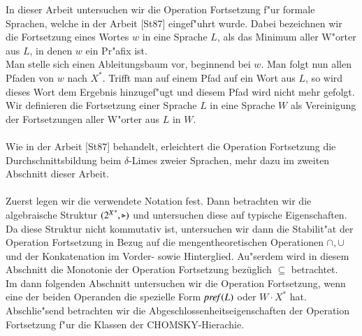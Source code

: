 In dieser Arbeit untersuchen wir die Operation Fortsetzung f"ur formale Sprachen, welche in der Arbeit [St87] eingef"uhrt wurde. Dabei bezeichnen wir die Fortsetzung eines Wortes $w$ in eine Sprache $L$, als das Minimum aller W"orter aus $L$, in denen $w$ ein Pr"afix ist. 
\\Man stelle sich einen Ableitungsbaum vor, beginnend bei $w$.
Man folgt nun allen Pfaden von $w$ nach $X^*$. Trifft man auf einem Pfad auf ein Wort aus $L$, so wird dieses Wort dem Ergebnis hinzugef"ugt und diesem Pfad wird nicht mehr gefolgt.\\
Wir definieren die Fortsetzung einer Sprache $L$ in eine Sprache $W$ als Vereinigung der Fortsetzungen aller W"orter aus $L$ in $W$.\\\\
Wie in der Arbeit [St87] behandelt, erleichtert die Operation Fortsetzung die Durchschnittsbildung beim $\delta$-Limes zweier Sprachen, mehr dazu im zweiten Abschnitt dieser Arbeit.\\\\
Zuerst legen wir die verwendete Notation fest. Dann betrachten wir die algebraische Struktur $({2^X}^*,\triangleright)$ und untersuchen diese auf typische Eigenschaften.
Da diese Struktur nicht kommutativ ist, untersuchen wir dann die Stabilit"at der Operation Fortsetzung in Bezug auf die mengentheoretischen Operationen $\cap,\cup$ und der Konkatenation im Vorder- sowie Hinterglied.
Au"serdem wird in diesem Abschnitt die Monotonie der Operation Fortsetzung bezüglich $\subseteq$ betrachtet.
\\Im dann folgenden Abschnitt untersuchen wir die Operation Fortsetzung, wenn eine der beiden Operanden die spezielle Form $\mathit{pref{(}}L)$ oder $W\cdot X^*$ hat. Abschlie"send betrachten wir die Abgeschlossenheitseigenschaften der Operation Fortsetzung f"ur die Klassen der CHOMSKY-Hierachie.



